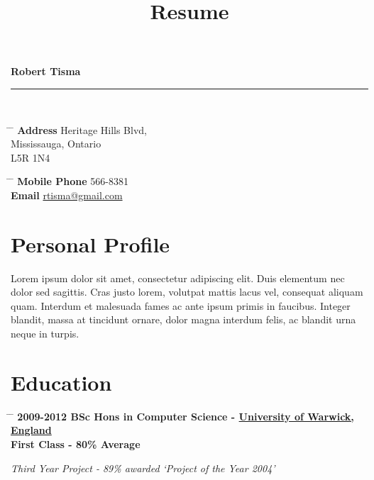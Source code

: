 \documentclass{article}
\title{Resume}
\author{\UserName}
\makeatletter
\def \UserName {Robert Tisma}
\def \UserEmail {rtisma@gmail.com}
\def \UserPhone {416 566-8381}
\def \UserStreetAddress {4651 Heritage Hills Blvd}
\def \UserCity {Mississauga}
\def \UserProvince {Ontario}
\def \UserPostalCode {L5R 1N4}
\makeatother
\begin{document}
{\huge{\color{slateblue}\textbf{\UserName}}}\\
\rule{\textwidth}{0.5mm}\\


\parbox{0.5\textwidth}{
\begin{tabbing}
\hspace{3cm} \= \hspace{4cm} \= \kill
{\bf Address} \> \UserStreetAddress,\\
\> \UserCity, \UserProvince \\ 
\> \UserPostalCode \\
\end{tabbing}
}\hfil\parbox{0.5\textwidth}{
\begin{tabbing}
\hspace{3cm} \= \hspace{4cm} \= \kill
{\bf Mobile Phone} \> \UserPhone \\
{\bf Email} \> \href{mailto:\UserEmail}{\UserEmail} \\
\end{tabbing}
}


\section*{Personal Profile}

Lorem ipsum dolor sit amet, consectetur adipiscing elit. Duis elementum nec dolor sed sagittis. Cras justo lorem, volutpat mattis lacus vel, consequat aliquam quam. Interdum et malesuada fames ac ante ipsum primis in faucibus. Integer blandit, massa at tincidunt ornare, dolor magna interdum felis, ac blandit urna neque in turpis.


\section*{Education}

\begin{tabbing}
\hspace{2cm} \= \hspace{4cm} \= \kill
\bf{2009-2012} \> BSc Hons in Computer Science - \href{http://www.warwick.ac.uk}{University of Warwick, England} \\
\>First Class - 80\% Average\\
\rule{0mm}{5mm}\>\+
\textit{Third Year Project - 89\% awarded `Project of the Year 2004'}
\end{tabbing}
\end{document}
